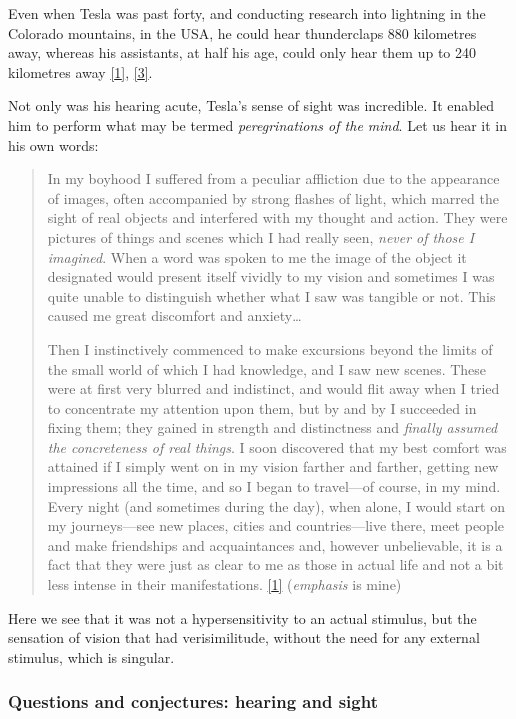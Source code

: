 \documentclass[
  12pt,
  british,
  a4paper,
  rgb,
  dvipsnames,
  svgnames,
  hyphens]{article}
\begin{document}
Even when Tesla was past forty, and conducting research into lightning
in the Colorado mountains, in the USA, he could hear thunderclaps 880
kilometres away, whereas his assistants, at half his age, could only
hear them up to 240 kilometres away
\protect\hyperlink{ref-john83}{{[}1{]}},
\protect\hyperlink{ref-cheney81}{{[}3{]}}.

Not only was his hearing acute, Tesla's sense of sight was incredible.
It enabled him to perform what may be termed \emph{peregrinations of the
mind}. Let us hear it in his own words:

\begin{quote}
In my boyhood I suffered from a peculiar affliction due to the
appearance of images, often accompanied by strong flashes of light,
which marred the sight of real objects and interfered with my thought
and action. They were pictures of things and scenes which I had really
seen, \emph{never of those I imagined}. When a word was spoken to me the
image of the object it designated would present itself vividly to my
vision and sometimes I was quite unable to distinguish whether what I
saw was tangible or not. This caused me great discomfort and
anxiety\ldots{}

Then I instinctively commenced to make excursions beyond the limits of
the small world of which I had knowledge, and I saw new scenes. These
were at first very blurred and indistinct, and would flit away when I
tried to concentrate my attention upon them, but by and by I succeeded
in fixing them; they gained in strength and distinctness and
\emph{finally assumed the concreteness of real things}. I soon
discovered that my best comfort was attained if I simply went on in my
vision farther and farther, getting new impressions all the time, and so
I began to travel---of course, in my mind. Every night (and sometimes
during the day), when alone, I would start on my journeys---see new
places, cities and countries---live there, meet people and make
friendships and acquaintances and, however unbelievable, it is a fact
that they were just as clear to me as those in actual life and not a bit
less intense in their manifestations.
\protect\hyperlink{ref-john83}{{[}1{]}} (\emph{emphasis} is mine)
\end{quote}

Here we see that it was not a hypersensitivity to an actual stimulus,
but the sensation of vision that had verisimilitude, without the need
for any external stimulus, which is singular.

\hypertarget{questions-and-conjectures-hearing-and-sight}{%
\subsubsection{Questions and conjectures: hearing and
sight}\label{questions-and-conjectures-hearing-and-sight}}
\end{document}
